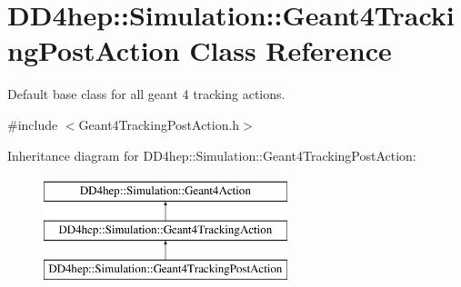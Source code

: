 \hypertarget{class_d_d4hep_1_1_simulation_1_1_geant4_tracking_post_action}{}\section{D\+D4hep\+:\+:Simulation\+:\+:Geant4\+Tracking\+Post\+Action Class Reference}
\label{class_d_d4hep_1_1_simulation_1_1_geant4_tracking_post_action}


Default base class for all geant 4 tracking actions.  




{\ttfamily \#include $<$Geant4\+Tracking\+Post\+Action.\+h$>$}

Inheritance diagram for D\+D4hep\+:\+:Simulation\+:\+:Geant4\+Tracking\+Post\+Action\+:\begin{figure}[H]
\begin{center}
\leavevmode
\includegraphics[height=3.000000cm]{class_d_d4hep_1_1_simulation_1_1_geant4_tracking_post_action}
\end{center}
\end{figure}
